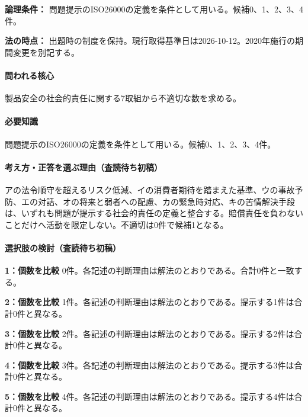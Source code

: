 \noindent\textbf{論理条件：} 問題提示のISO26000の定義を条件として用いる。候補0、1、2、3、4件。\par

\noindent\textbf{法の時点：} 出題時の制度を保持。現行取得基準日は2026-10-12。2020年施行の期間変更を別記する。\par

\paragraph{問われる核心} 製品安全の社会的責任に関する7取組から不適切な数を求める。

\paragraph{必要知識} 問題提示のISO26000の定義を条件として用いる。候補0、1、2、3、4件。

\paragraph{考え方・正答を選ぶ理由（査読待ち初稿）} アの法令順守を超えるリスク低減、イの消費者期待を踏まえた基準、ウの事故予防、エの対話、オの将来と弱者への配慮、カの緊急時対応、キの苦情解決手段は、いずれも問題が提示する社会的責任の定義と整合する。賠償責任を負わないことだけへ活動を限定しない。不適切は0件で候補1となる。

\paragraph{選択肢の検討（査読待ち初稿）}\mbox{}\par

\noindent\textbf{1：個数を比較} 0件。各記述の判断理由は解法のとおりである。合計0件と一致する。\par

\noindent\textbf{2：個数を比較} 1件。各記述の判断理由は解法のとおりである。提示する1件は合計0件と異なる。\par

\noindent\textbf{3：個数を比較} 2件。各記述の判断理由は解法のとおりである。提示する2件は合計0件と異なる。\par

\noindent\textbf{4：個数を比較} 3件。各記述の判断理由は解法のとおりである。提示する3件は合計0件と異なる。\par

\noindent\textbf{5：個数を比較} 4件。各記述の判断理由は解法のとおりである。提示する4件は合計0件と異なる。\par

